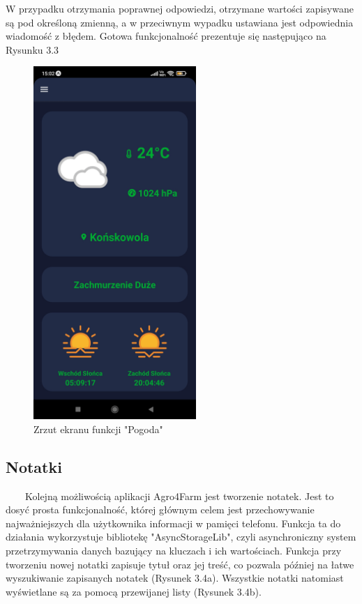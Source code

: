 \documentclass[a4paper,12pt,oneside]{book}
\begin{document}
	\newpage
	
	W przypadku otrzymania poprawnej odpowiedzi, otrzymane wartości zapisywane są pod określoną zmienną, a w przeciwnym wypadku ustawiana jest odpowiednia wiadomość z błędem. Gotowa funkcjonalność prezentuje się następująco na Rysunku 3.3
	
	\begin{figure}[H]
		\centering
		\includegraphics[width=0.55\textwidth]{grafika/pogoda.jpg}
		\caption{Zrzut ekranu funkcji "Pogoda"}
	\end{figure}
	
	\subsection{Notatki}
	\ \ \ \
		Kolejną możliwością aplikacji Agro4Farm jest tworzenie notatek. Jest to dosyć prosta funkcjonalność, której głównym celem jest przechowywanie najważniejszych dla użytkownika informacji w pamięci telefonu. Funkcja ta do działania wykorzystuje bibliotekę "AsyncStorageLib", czyli asynchroniczny system przetrzymywania danych bazujący na kluczach i ich wartościach. Funkcja przy tworzeniu nowej notatki zapisuje tytuł oraz jej treść, co pozwala później na łatwe wyszukiwanie zapisanych notatek (Rysunek 3.4a). Wszystkie notatki natomiast wyświetlane są za pomocą przewijanej listy (Rysunek 3.4b).
		
\end{document}
